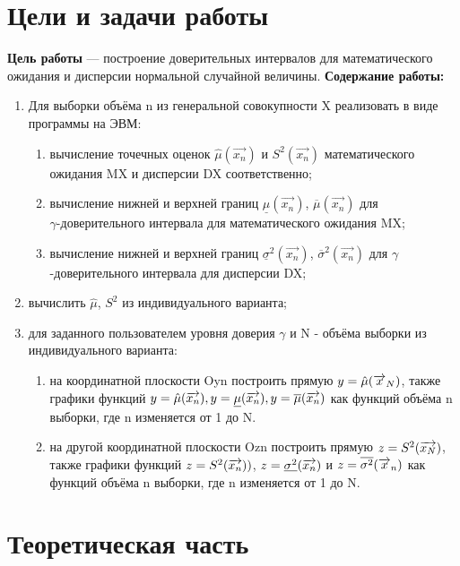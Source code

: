 \chapter{Цели и задачи работы}
\textbf{Цель работы} --- построение доверительных интервалов для математического ожидания и дисперсии нормальной случайной величины.
\textbf{Содержание работы:}
\begin{enumerate}
\item Для выборки объёма n из генеральной совокупности X реализовать в виде программы на ЭВМ:
\begin{enumerate}
\item вычисление точечных оценок $\hat{\mu}(\overrightarrow{x_{n}})$ и $S^{2}(\overrightarrow{x_{n}})$ математического ожидания MX и дисперсии DX соответственно;
\item вычисление нижней и верхней границ $\underline{\mu}(\overrightarrow{x_{n}})$, $\overline{\mu}(\overrightarrow{x_{n}})$ для\\
$\gamma$-доверительного интервала для математического ожидания MX;
\item вычисление нижней и верхней границ $\underline{\sigma}^{2}(\overrightarrow{x_{n}})$, $\overline{\sigma}^{2}(\overrightarrow{x_{n}})$ для $\gamma$-доверительного интервала для дисперсии DX;
\end{enumerate}
\item вычислить $\hat\mu$, $S^2$ из индивидуального варианта;
\item для заданного пользователем уровня доверия $\gamma$ и N - объёма выборки из индивидуального варианта:
\begin{enumerate}
\item на координатной плоскости Oyn построить прямую $y =\hat\mu(\overrightarrow{x}_{N})$, также графики функций $y = \hat\mu(\overrightarrow{x_{n}}), y = \underline{\mu}(\overrightarrow{x_{n}}), y = \overline{\mu}(\overrightarrow{x_{n}})$ как функций объёма n выборки, где n изменяется от 1 до N. 
\item на другой координатной плоскости Ozn построить прямую $z = S^2(\overrightarrow{x_{N}})$, также графики функций $z = S^2(\overrightarrow{x_{n}}))$, $z = \underline{\sigma^{2}}(\overrightarrow{x_{n}})$ и $z = \overline{\sigma^{2}}(\overrightarrow{x}_{n})$ как функций объёма n выборки, где n изменяется от 1 до N. 
\end{enumerate}
\end{enumerate}

\chapter{Теоретическая часть}

